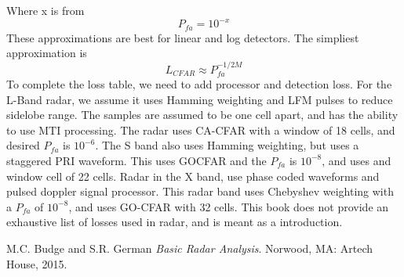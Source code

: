 \documentclass[12pt]{article}
\begin{document}
Where x is from
\begin{equation}
    P_{fa} = 10^{-x}
\end{equation}
These approximations are best for linear and log detectors. The simpliest approximation is 
\begin{equation}
    L_{CFAR} \approx P_{fa}^{-1/2M}
\end{equation}
To complete the loss table, we need to add processor and detection loss. For the L-Band radar, we assume it uses Hamming weighting and LFM pulses to reduce sidelobe range. The samples are assumed to be one cell apart, and has the ability to use MTI processing. The radar uses CA-CFAR with a window of 18 cells, and desired $P_{fa}$ is $10^{-6}$. The S band also uses Hamming weighting, but uses a staggered PRI waveform. This uses GOCFAR and the $P_{fa}$ is $10^{-8}$, and uses and window cell of 22 cells. Radar in the X band, use phase coded waveforms and pulsed doppler signal processor. This radar band uses Chebyshev weighting with a $P_{fa}$ of $10^{-8}$, and uses GO-CFAR with 32 cells. This book does not provide an exhaustive list of losses used in radar, and is meant as a introduction. 
\pagebreak
\begin{thebibliography}{9}
     M.C. Budge and S.R. German \textit{Basic Radar Analysis}. Norwood, MA: Artech House, 2015.
\end{thebibliography}

\pagebreak
\end{document}
